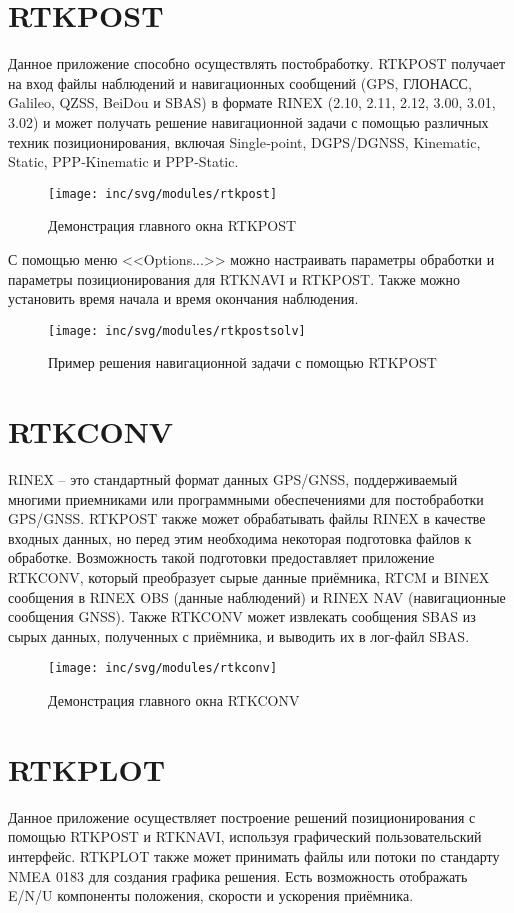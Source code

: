 \section{RTKPOST}

Данное приложение способно осуществлять постобработку. RTKPOST получает на вход файлы наблюдений и навигационных сообщений (GPS, ГЛОНАСС, Galileo, QZSS, BeiDou и SBAS) в формате RINEX (2.10, 2.11,
2.12, 3.00, 3.01, 3.02) и может получать решение навигационной задачи с помощью различных техник позиционирования, включая Single‐point, DGPS/DGNSS, Kinematic, Static, PPP‐Kinematic и PPP‐Static.
\begin{figure}[ht]
	\centering
	\texttt{[image: inc/svg/modules/rtkpost]}
	\caption{Демонстрация главного окна RTKPOST}
	\label{fig:rtkpost}
\end{figure}

С помощью меню <<Options...>> можно настраивать параметры обработки и параметры позиционирования для RTKNAVI и RTKPOST. Также можно установить время начала и время окончания наблюдения.
\begin{figure}[ht]
	\centering
	\texttt{[image: inc/svg/modules/rtkpostsolv]}
	\caption{Пример решения навигационной задачи с помощью RTKPOST}
	\label{fig:rtkpostsolv}
\end{figure}

\section{RTKCONV}
RINEX -- это стандартный формат данных GPS/GNSS, поддерживаемый многими
приемниками или программными обеспечениями для постобработки GPS/GNSS. RTKPOST также может обрабатывать файлы RINEX в качестве входных данных, но перед этим необходима некоторая подготовка файлов к обработке. Возможность такой подготовки предоставляет приложение RTKCONV, который преобразует сырые данные приёмника, RTCM и BINEX сообщения в RINEX OBS (данные наблюдений) и RINEX NAV (навигационные сообщения GNSS). Также RTKCONV может извлекать сообщения SBAS из сырых данных, полученных с приёмника, и выводить их в лог-файл SBAS.
\begin{figure}[ht]
	\centering
	\texttt{[image: inc/svg/modules/rtkconv]}
	\caption{Демонстрация главного окна RTKCONV}
	\label{fig:rtkconv}
\end{figure}

\section{RTKPLOT}
Данное приложение осуществляет построение решений позиционирования с помощью RTKPOST и RTKNAVI, используя графический пользовательский интерфейс. RTKPLOT также может принимать файлы или потоки по стандарту NMEA 0183 для создания графика решения. Есть возможность отображать E/N/U компоненты положения, скорости и ускорения приёмника. 

